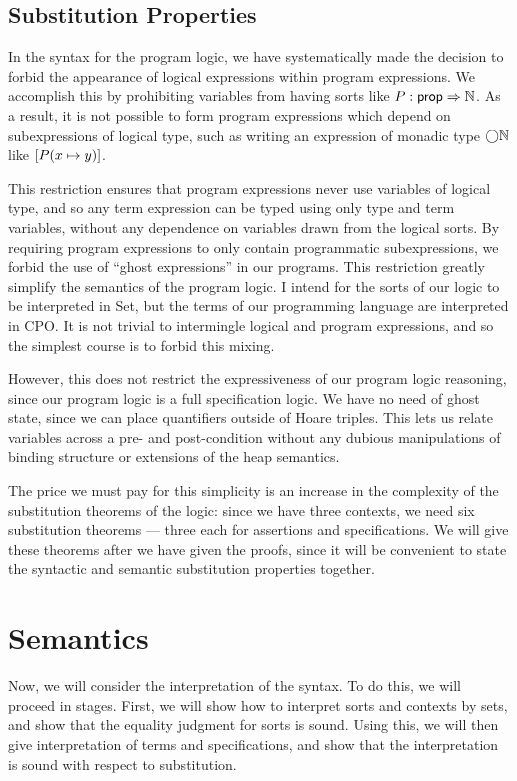 \subsection{Substitution Properties}

In the syntax for the program logic, we have systematically made the
decision to forbid the appearance of logical expressions within
program expressions. We accomplish this by prohibiting variables from
having sorts like $P : \mathsf{prop} \Rightarrow \mathbb{N}$. As a result, it is not
possible to form program expressions which depend on subexpressions of
logical type, such as writing an expression of monadic type
$\bigcirc{\mathbb{N}}$ like $[P(x \mapsto y)]$.

This restriction ensures that program expressions never use variables
of logical type, and so any term expression can be typed using only
type and term variables, without any dependence on variables drawn
from the logical sorts. By requiring program expressions to only
contain programmatic subexpressions, we forbid the use of ``ghost
expressions'' in our programs. This restriction greatly simplify the
semantics of the program logic. I intend for the sorts of our logic to
be interpreted in Set, but the terms of our programming language are
interpreted in CPO. It is not trivial to intermingle logical and
program expressions, and so the simplest course is to forbid this
mixing.

However, this does not restrict the expressiveness of our program
logic reasoning, since our program logic is a full specification
logic. We have no need of ghost state, since we can place quantifiers
outside of Hoare triples. This lets us relate variables across a pre-
and post-condition without any dubious manipulations of binding
structure or extensions of the heap semantics.

The price we must pay for this simplicity is an increase in the
complexity of the substitution theorems of the logic: since we have
three contexts, we need six substitution theorems --- three each for
assertions and specifications. We will give these theorems after we
have given the proofs, since it will be convenient to state the syntactic
and semantic substitution properties together. 

\section{Semantics}

Now, we will consider the interpretation of the syntax. To do this,
we will proceed in stages. First, we will show how to interpret sorts and
contexts by sets, and show that the equality judgment for sorts is
sound. Using this, we will then give interpretation of terms and
specifications, and show that the interpretation is sound with respect
to substitution.

